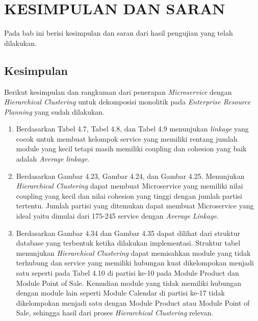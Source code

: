 \chapter{KESIMPULAN DAN SARAN}

\vspace{4.5pt}
Pada bab ini berisi kesimpulan dan saran dari hasil pengujian yang telah dilakukan.  


\section{Kesimpulan}
Berikut kesimpulan dan rangkuman dari penerapan \textit{Microservice} dengan \textit{Hierarchical Clustering} untuk dekomposisi monolitik pada \textit{Enterprise Resource Planning} yang sudah dilakukan.

\begin{enumerate}[nolistsep,leftmargin=0.5cm]
    \item Berdasarkan Tabel 4.7,  Tabel 4.8, dan Tabel 4.9 menunjukan \textit{linkage} yang cocok untuk membuat kelompok service yang memiliki rentang jumlah module yang kecil tetapi masih memiliki coupling dan cohesion yang baik adalah \textit{Average} \textit{linkage}.
    \item Berdasarkan Gambar 4.23, Gambar 4.24,  dan Gambar 4.25. Menunjukan \textit{Hierarchical Clustering} dapat membuat Microservice yang memiliki nilai coupling yang kecil dan nilai cohesion yang tinggi dengan jumlah partisi tertentu. Jumlah partisi yang ditemukan dapat membuat Microservice yang ideal yaitu dimulai dari 175-245 service dengan \textit{Average} \textit{Linkage}. 
    \item Berdasarkan Gambar 4.34  dan Gambar 4.35 dapat dilihat dari struktur database yang terbentuk ketika dilakukan implementasi. Struktur tabel menunjukan \textit{Hierarchical Clustering} dapat memisahkan module yang tidak terhubung dan service yang memiliki hubungan kuat dikelompokan menjadi satu seperti pada Tabel 4.10 di partisi ke-10 pada Module Product dan Module Point of Sale. Kemudian module yang tidak memiliki hubungan dengan module lain seperti Module Calendar di partisi ke-17 tidak dikelompokan menjadi satu dengan Module Product atau Module Point of Sale, sehingga hasil dari proses \textit{Hierarchical Clustering} relevan.\\
\end{enumerate}

